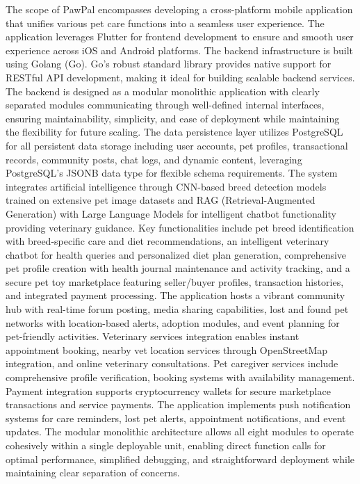 The scope of PawPal encompasses developing a cross-platform mobile application that unifies various pet care functions into a seamless user experience. The application leverages Flutter for frontend development to ensure and smooth user experience across iOS and Android platforms. The backend infrastructure is built using Golang (Go). Go's robust standard library provides native support for RESTful API development, making it ideal for building scalable backend services. The backend is designed as a modular monolithic application with clearly separated modules communicating through well-defined internal interfaces, ensuring maintainability, simplicity, and ease of deployment while maintaining the flexibility for future scaling.  The data persistence layer utilizes PostgreSQL for all persistent data storage including user accounts, pet profiles, transactional records, community posts, chat logs, and dynamic content, leveraging PostgreSQL's JSONB data type for flexible schema requirements. The system integrates artificial intelligence through CNN-based breed detection models trained on extensive pet image datasets and RAG (Retrieval-Augmented Generation) with Large Language Models for intelligent chatbot functionality providing veterinary guidance. Key functionalities include pet breed identification with breed-specific care and diet recommendations, an intelligent veterinary chatbot for health queries and personalized diet plan generation, comprehensive pet profile creation with health journal maintenance and activity tracking, and a secure pet toy marketplace featuring seller/buyer profiles, transaction histories, and integrated payment processing. The application hosts a vibrant community hub with real-time forum posting, media sharing capabilities, lost and found pet networks with location-based alerts, adoption modules, and event planning for pet-friendly activities. Veterinary services integration enables instant appointment booking, nearby vet location services through OpenStreetMap integration, and online veterinary consultations. Pet caregiver services include comprehensive profile verification, booking systems with availability management. Payment integration supports cryptocurrency wallets for secure marketplace transactions and service payments. The application implements push notification systems for care reminders, lost pet alerts, appointment notifications, and event updates. The modular monolithic architecture allows all eight modules to operate cohesively within a single deployable unit, enabling direct function calls for optimal performance, simplified debugging, and straightforward deployment while maintaining clear separation of concerns.

